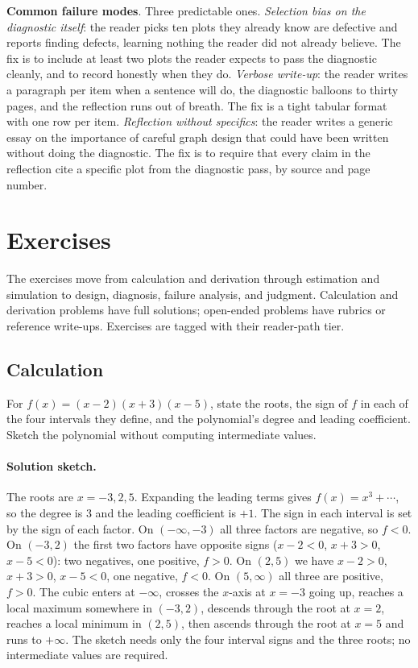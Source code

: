 \begin{project}
\textbf{Common failure modes}. Three predictable ones.
\emph{Selection bias on the diagnostic itself}: the reader picks
ten plots they already know are defective and reports finding
defects, learning nothing the reader did not already believe. The
fix is to include at least two plots the reader expects to pass the
diagnostic cleanly, and to record honestly when they do.
\emph{Verbose write-up}: the reader writes a paragraph per item
when a sentence will do, the diagnostic balloons to thirty pages,
and the reflection runs out of breath. The fix is a tight tabular
format with one row per item.
\emph{Reflection without specifics}: the reader writes a generic
essay on the importance of careful graph design that could have
been written without doing the diagnostic. The fix is to require
that every claim in the reflection cite a specific plot from the
diagnostic pass, by source and page number.
\end{project}

\section{Exercises}

The exercises move from calculation and derivation through estimation
and simulation to design, diagnosis, failure analysis, and judgment.
Calculation and derivation problems have full solutions; open-ended
problems have rubrics or reference write-ups. Exercises are tagged
with their reader-path tier.

\subsection*{Calculation}

\begin{exercise}
For $f(x) = (x - 2)(x + 3)(x - 5)$, state the roots, the sign of
$f$ in each of the four intervals they define, and the polynomial's
degree and leading coefficient. Sketch the polynomial without
computing intermediate values.

\paragraph{Solution sketch.}
The roots are $x = -3, 2, 5$. Expanding the leading terms gives
$f(x) = x^{3} + \cdots$, so the degree is $3$ and the leading
coefficient is $+1$. The sign in each interval is set by the sign
of each factor. On $(-\infty, -3)$ all three factors are negative,
so $f < 0$. On $(-3, 2)$ the first two factors have opposite
signs ($x - 2 < 0$, $x + 3 > 0$, $x - 5 < 0$): two negatives, one
positive, $f > 0$. On $(2, 5)$ we have $x - 2 > 0$, $x + 3 > 0$,
$x - 5 < 0$, one negative, $f < 0$. On $(5, \infty)$ all three are
positive, $f > 0$. The cubic enters at $-\infty$, crosses the
$x$-axis at $x = -3$ going up, reaches a local maximum somewhere
in $(-3, 2)$, descends through the root at $x = 2$, reaches a
local minimum in $(2, 5)$, then ascends through the root at $x = 5$
and runs to $+\infty$. The sketch needs only the four interval
signs and the three roots; no intermediate values are required.
\end{exercise}

